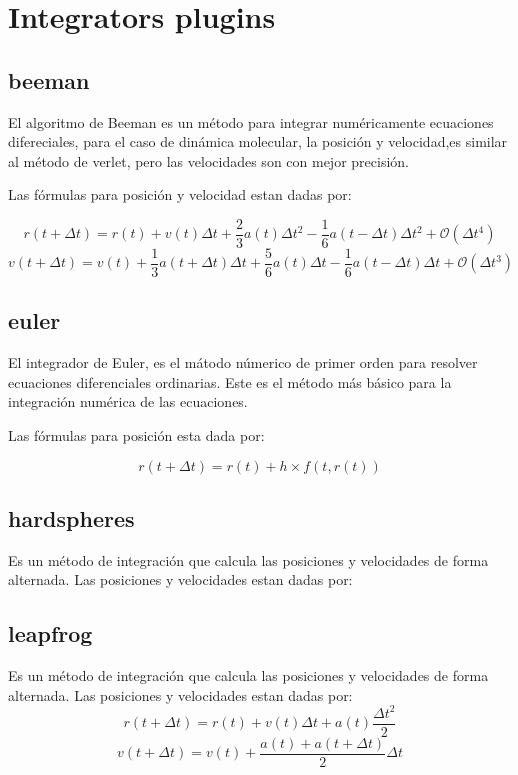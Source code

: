 \section{Integrators plugins}
\subsection{beeman}
El algoritmo de Beeman es un m\'etodo para integrar num\'ericamente ecuaciones
difereciales, para el caso de din\'amica molecular, la posici\'on y velocidad,es
similar al m\'etodo de verlet, pero las velocidades son con mejor precisi\'on.

Las f\'ormulas para posici\'on y velocidad estan dadas por:

$$r(t+\Delta t) = r(t) + v(t)\Delta t + \frac{2}{3}a(t)\Delta t^2 -
\frac{1}{6}a(t-\Delta t)\Delta t^2 +\mathcal{O}(\Delta t^4)$$
$$v(t+\Delta t) = v(t) + \frac{1}{3}a(t+\Delta t)\Delta t+\frac{5}{6}a(t)\Delta
t-\frac{1}{6}a(t-\Delta t)\Delta t+\mathcal{O}(\Delta t^3)$$

\subsection{euler}
El integrador de Euler, es el m\'atodo n\'umerico de primer orden para resolver
ecuaciones diferenciales ordinarias. Este es el m\'etodo m\'as b\'asico para la
integraci\'on num\'erica de las ecuaciones.

Las f\'ormulas para posici\'on esta dada por:

$$r(t+\Delta t) = r(t) + h\times f(t,r(t))$$

\subsection{hardspheres}
Es un m\'etodo de integraci\'on que calcula las posiciones y velocidades de
forma alternada. Las posiciones y velocidades estan dadas por:

\subsection{leapfrog}
Es un m\'etodo de integraci\'on que calcula las posiciones y velocidades de
forma alternada. Las posiciones y velocidades estan dadas por:
$$r(t+\Delta t) = r(t) + v(t)\Delta t + a(t)\frac{\Delta t^2}{2}$$
$$v(t+\Delta t) = v(t) + \frac{a(t)+a(t+\Delta t)}{2}\Delta t$$


